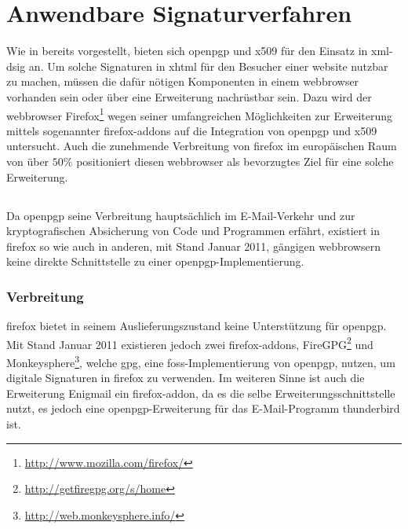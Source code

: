 

\chapter{Anwendbare Signaturverfahren}
\label{chap:Signaturverfahren}
Wie in  bereits vorgestellt, bieten sich \gls{openpgp} und \gls{x509} für den Einsatz in
\gls{xml-dsig} an. Um solche Signaturen in \gls{xhtml} für den Besucher einer \gls{website} nutzbar zu machen, müssen die dafür nötigen Komponenten in einem
\gls{webbrowser} vorhanden sein oder über eine Erweiterung nachrüstbar sein. Dazu wird der \gls{webbrowser}
Firefox\footnote{\url{http://www.mozilla.com/firefox/}} wegen seiner umfangreichen Möglichkeiten zur Erweiterung mittels sogenannter
\glspl{firefox-addon} auf die Integration von \gls{openpgp} und \gls{x509} untersucht. Auch die zunehmende Verbreitung von \gls{firefox} im europäischen Raum
von über $50\%$ \cite{firefox-verbreitung} positioniert diesen \gls{webbrowser} als bevorzugtes Ziel für eine solche Erweiterung.

\section{}
\label{sec:Signaturverfahren:OpenPGP}
Da \gls{openpgp} seine Verbreitung hauptsächlich im E-Mail-Verkehr \cite{Garfinkel:2003:EEC:1123196.1123244} und zur kryptografischen Absicherung von Code und
Programmen erfährt, existiert in \gls{firefox} so wie auch in anderen, mit Stand Januar 2011, gängigen \gls{webbrowser}n keine direkte Schnittstelle zu einer
\gls{openpgp}-Implementierung.

\subsection{Verbreitung}
\gls{firefox} bietet in seinem Auslieferungszustand keine Unterstützung für \gls{openpgp}. Mit Stand Januar 2011 existieren jedoch zwei \glspl{firefox-addon},
FireGPG\footnote{\url{http://getfiregpg.org/s/home}} und
Monkeysphere\footnote{\url{http://web.monkeysphere.info/}}, welche \gls{gpg}, eine \gls{foss}-Implementierung von \gls{openpgp},
nutzen, um digitale Signaturen in \gls{firefox} zu verwenden. Im weiteren Sinne ist auch die Erweiterung Enigmail ein \gls{firefox-addon}, da es die selbe
Erweiterungsschnittstelle nutzt, es jedoch eine \gls{openpgp}-Erweiterung für das E-Mail-Programm \gls{thunderbird} ist.

